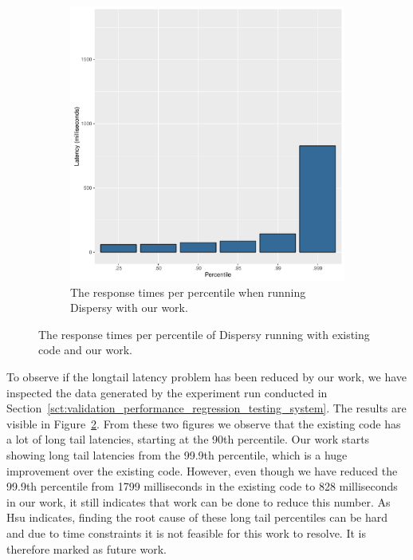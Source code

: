 \begin{figure}[h]
\begin{subfigure}[b]{.5\linewidth}
		\includegraphics[width=\textwidth]{experimentation/images/response_time_percentiles_async}
		\caption{The response times per percentile when running Dispersy with our work.}
		\label{fig:response_times_percentiles_async}
	\end{subfigure}
	\caption{The response times per percentile of Dispersy running with existing code and our work.}
	\label{fig:resposne_times_percentiles}
\end{figure}

To observe if the longtail latency problem has been reduced by our work, we have inspected the data generated by the experiment run conducted in Section~\ref{sct:validation_performance_regression_testing_system}.
The results are visible in Figure~\ref{fig:resposne_times_percentiles}.
From these two figures we observe that the existing code has a lot of long tail latencies, starting at the 90th percentile.
Our work starts showing long tail latencies from the 99.9th percentile, which is a huge improvement over the existing code.
However, even though we have reduced the 99.9th percentile from 1799 milliseconds in the existing code to 828 milliseconds in our work, it still indicates that work can be done to reduce this number.
As Hsu indicates, finding the root cause of these long tail percentiles can be hard and due to time constraints it is not feasible for this work to resolve.
It is therefore marked as future work.

